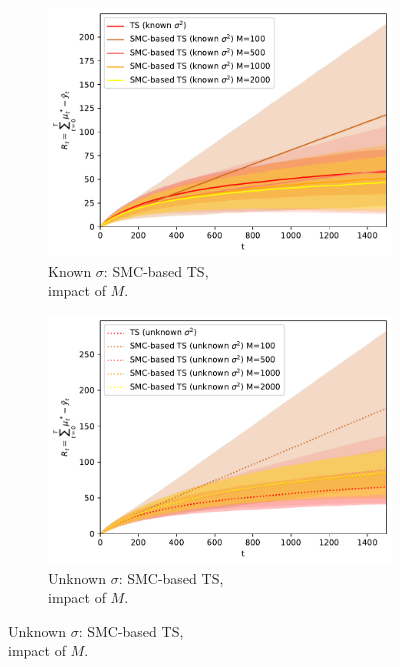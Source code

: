 \begin{figure}[!h]
	\begin{subfigure}[b]{0.46\textwidth}
		\centering
		\includegraphics[width=\textwidth]{./fods_figs/static/linear_gaussian/A5/theta-0.2_-0.2_-0.1_-0.1_0._0._0.1_0.1_0.2_0.2_sigma0.5_0.5_0.5_0.5_0.5_allM_cumulative_regret_ts_knownsigma}
		\caption{Known $\sigma$: SMC-based TS, \\ impact of $M$.}
	\end{subfigure}
	\begin{subfigure}[b]{0.46\textwidth}
		\centering
		\includegraphics[width=\textwidth]{./fods_figs/static/linear_gaussian/A5/theta-0.2_-0.2_-0.1_-0.1_0._0._0.1_0.1_0.2_0.2_sigma0.5_0.5_0.5_0.5_0.5_allM_cumulative_regret_ts_unknownsigma}
		\caption{Unknown $\sigma$: SMC-based TS, \\ impact of $M$.}
	\end{subfigure}
	

\end{figure}
